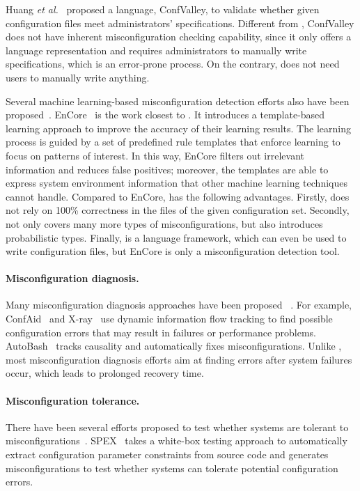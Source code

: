 Huang {\em et al.}~\cite{huang15confvalley} proposed a 
language, ConfValley, to validate 
whether given configuration files meet administrators' specifications. 
Different from \app, ConfValley does not
have inherent misconfiguration checking capability, since it only offers
a language representation and requires administrators to
manually write specifications, which is an error-prone
process. On the contrary, \app does not need users to manually
write anything.

Several machine learning-based misconfiguration detection efforts 
also have been proposed~\cite{yuan11context, zhang14encore}.
EnCore~\cite{zhang14encore} is the work closest to \app.
It introduces a template-based
learning approach to improve the accuracy of their learning results.
The learning process is guided by a set of predefined rule templates
that enforce learning to focus on patterns of interest.
In this way, EnCore filters out irrelevant information and reduces
false positives; moreover, the templates are able to express
system environment information that other machine learning
techniques cannot handle.
Compared to EnCore, \app has the following advantages.
Firstly, \app does not rely on 100\% correctness in the files of the given configuration set. 
Secondly, \app not only covers many more types of 
misconfigurations, but also introduces probabilistic types.
Finally, \app is a language framework, which can 
even be used to write configuration files, but EnCore is only a 
misconfiguration detection tool.

\paragraph{Misconfiguration diagnosis.}
Many misconfiguration diagnosis approaches have been proposed%
~\cite{attariyan10automating, attariyan12x-ray}.
For example, ConfAid~\cite{attariyan10automating} 
and X-ray~\cite{attariyan12x-ray} use dynamic information
flow tracking to find possible configuration errors that may result in
failures or performance problems. AutoBash~\cite{su07autobash} 
tracks causality and automatically fixes 
misconfigurations. Unlike \app, most misconfiguration
diagnosis efforts aim at finding errors after system
failures occur, which leads to prolonged recovery time.

\paragraph{Misconfiguration tolerance.}
There have been several efforts proposed to test whether systems are 
tolerant to misconfigurations~\cite{xu13do}. 
SPEX~\cite{xu13do} takes a white-box testing approach to automatically
extract configuration parameter constraints from source code and generates 
misconfigurations to test whether systems can tolerate potential
configuration errors.

